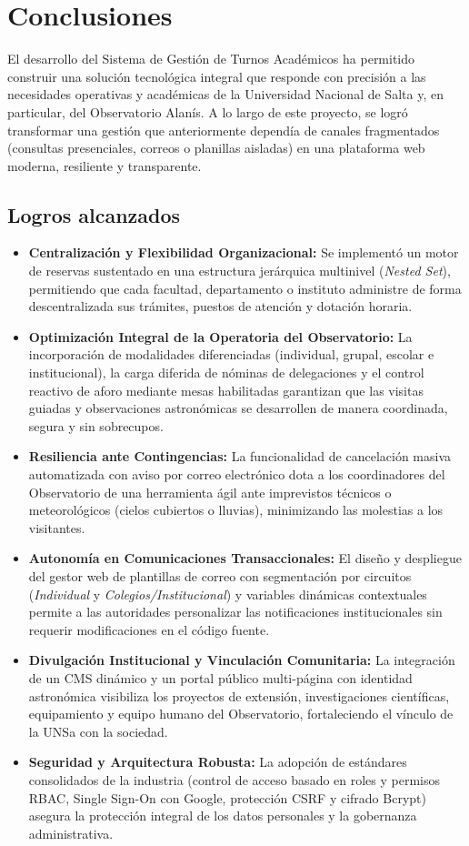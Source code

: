\chapter{Conclusiones}
El desarrollo del Sistema de Gestión de Turnos Académicos ha permitido construir una solución tecnológica integral que responde con precisión a las necesidades operativas y académicas de la Universidad Nacional de Salta y, en particular, del Observatorio Alanís. A lo largo de este proyecto, se logró transformar una gestión que anteriormente dependía de canales fragmentados (consultas presenciales, correos o planillas aisladas) en una plataforma web moderna, resiliente y transparente.

\section{Logros alcanzados}
\begin{itemize}
    \item \textbf{Centralización y Flexibilidad Organizacional:} Se implementó un motor de reservas sustentado en una estructura jerárquica multinivel (\textit{Nested Set}), permitiendo que cada facultad, departamento o instituto administre de forma descentralizada sus trámites, puestos de atención y dotación horaria.
    \item \textbf{Optimización Integral de la Operatoria del Observatorio:} La incorporación de modalidades diferenciadas (individual, grupal, escolar e institucional), la carga diferida de nóminas de delegaciones y el control reactivo de aforo mediante mesas habilitadas garantizan que las visitas guiadas y observaciones astronómicas se desarrollen de manera coordinada, segura y sin sobrecupos.
    \item \textbf{Resiliencia ante Contingencias:} La funcionalidad de cancelación masiva automatizada con aviso por correo electrónico dota a los coordinadores del Observatorio de una herramienta ágil ante imprevistos técnicos o meteorológicos (cielos cubiertos o lluvias), minimizando las molestias a los visitantes.
    \item \textbf{Autonomía en Comunicaciones Transaccionales:} El diseño y despliegue del gestor web de plantillas de correo con segmentación por circuitos (\textit{Individual} y \textit{Colegios/Institucional}) y variables dinámicas contextuales permite a las autoridades personalizar las notificaciones institucionales sin requerir modificaciones en el código fuente.
    \item \textbf{Divulgación Institucional y Vinculación Comunitaria:} La integración de un CMS dinámico y un portal público multi-página con identidad astronómica visibiliza los proyectos de extensión, investigaciones científicas, equipamiento y equipo humano del Observatorio, fortaleciendo el vínculo de la UNSa con la sociedad.
    \item \textbf{Seguridad y Arquitectura Robusta:} La adopción de estándares consolidados de la industria (control de acceso basado en roles y permisos RBAC, Single Sign-On con Google, protección CSRF y cifrado Bcrypt) asegura la protección integral de los datos personales y la gobernanza administrativa.
\end{itemize}

